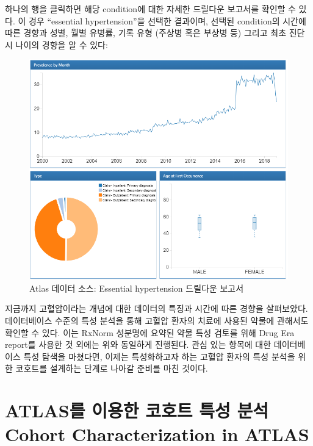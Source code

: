 \documentclass[10.5pt]{book}
\theoremstyle{definition}
\theoremstyle{definition}
\theoremstyle{definition}
\theoremstyle{remark}
\begin{document}
하나의 행을 클릭하면 해당 condition에 대한 자세한 드릴다운 보고서를
확인할 수 있다. 이 경우 ``essential hypertension''을 선택한 결과이며,
선택된 condition의 시간에 따른 경향과 성별, 월별 유병률, 기록 유형
(주상병 혹은 부상병 등) 그리고 최초 진단 시 나이의 경향을 알 수 있다:

\begin{figure}

{\centering \includegraphics[width=1\linewidth]{images/Characterization/atlasDataSourcesDrillDownReport} 

}

\caption{Atlas 데이터 소스: Essential hypertension 드릴다운 보고서}\label{fig:atlasDataSourcesDrillDownReport}
\end{figure}

지금까지 고혈압이라는 개념에 대한 데이터의 특징과 시간에 따른 경향을
살펴보았다. 데이터베이스 수준의 특성 분석을 통해 고혈압 환자의 치료에
사용된 약물에 관해서도 확인할 수 있다. 이는 RxNorm 성분명에 요약된 약물
특성 검토를 위해 Drug Era report를 사용한 것 외에는 위와 동일하게
진행된다. 관심 있는 항목에 대한 데이터베이스 특성 탐색을 마쳤다면,
이제는 특성화하고자 하는 고혈압 환자의 특성 분석을 위한 코호트를
설계하는 단계로 나아갈 준비를 마친 것이다.

\section{ATLAS를 이용한 코호트 특성 분석 Cohort Characterization in
ATLAS}\label{atlas-----cohort-characterization-in-atlas}
\end{document}
